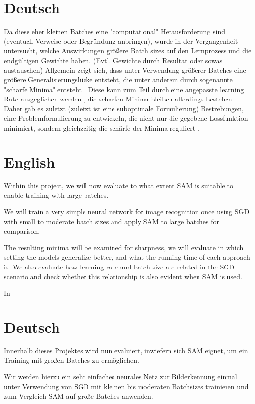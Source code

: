 \documentclass[10pt,conference,compsocconf]{IEEEtran}
\begin{document}
\section*{Deutsch}
Da diese eher kleinen Batches eine "computational" Herausforderung sind (eventuell Verweise oder Begründung anbringen), wurde in der Vergangenheit untersucht, welche Auswirkungen größere Batch sizes auf den Lernprozess und die endgültigen Gewichte haben. (Evtl. Gewichte durch Resultat oder sowas austauschen) 
Allgemein zeigt sich, dass unter Verwendung größerer Batches eine größere Generalisierungslücke entsteht, die unter anderem durch sogenannte "scharfe Minima" entsteht \cite{keskar2017largebatch}. Diese kann zum Teil durch eine angepasste learning Rate ausgeglichen werden \cite{goyal2018accurate}, die scharfen Minima bleiben allerdings bestehen. 
Daher gab es zuletzt (zuletzt ist eine suboptimale Formulierung) Bestrebungen, eine Problemformulierung zu entwickeln, die nicht nur die gegebene Lossfunktion minimiert, sondern gleichzeitig die schärfe der Minima reguliert \cite{foret2021sharpnessaware}. 

\section*{English}
Within this project, we will now evaluate to what extent SAM is suitable to enable training with large batches. 

We will train a very simple neural network for image recognition once using SGD with small to moderate batch sizes and apply SAM to large batches for comparison. 

The resulting minima will be examined for sharpness, we will evaluate in which setting the models generalize better, and what the running time of each approach is. 
We also evaluate how learning rate and batch size are related in the SGD scenario and check whether this relationship is also evident when SAM is used. 
 
In \cite{keskar2017largebatch}

\section*{Deutsch}
Innerhalb dieses Projektes wird nun evaluiert, inwiefern sich SAM eignet, um ein Training mit großen Batches zu ermöglichen. 

Wir werden hierzu ein sehr einfaches neurales Netz zur Bilderkennung einmal unter Verwendung von SGD mit kleinen bis moderaten Batchsizes trainieren und zum Vergleich SAM auf große Batches anwenden. 
\end{document}
